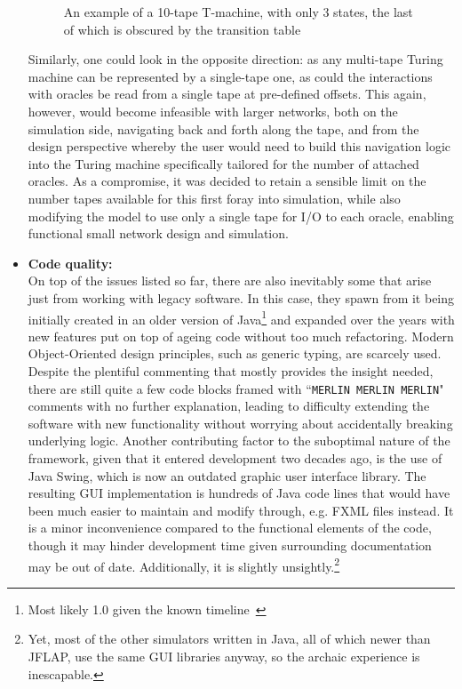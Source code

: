 \documentclass[12pt]{article}
\newcommand{\xmark}{\ding{55}}
\begin{document}
\begin{itemize}
\begin{figure}
					\caption{An example of a 10-tape T-machine, with only 3 states, the last of which is obscured by the transition table}
				\end{figure}
				Similarly, one could look in the opposite direction: as any multi-tape Turing machine can be represented by a single-tape one, as could the interactions with oracles be read from a single tape at pre-defined offsets.
				This again, however, would become infeasible with larger networks, both on the simulation side, navigating back and forth along the tape, and from the design perspective whereby the user would need to build this navigation logic into the Turing machine specifically tailored for the number of attached oracles.
				As a compromise, it was decided to retain a sensible limit on the number tapes available for this first foray into simulation, while also modifying the model to use only a single tape for I/O to each oracle, enabling functional small network design and simulation.\newpage
			\item[\xmark] \textbf{Code quality:\\}
				On top of the issues listed so far, there are also inevitably some that arise just from working with legacy software. In this case, they spawn from it being initially created in an older version of Java\footnote{Most likely 1.0 given the known timeline~\cite{procopiuc1996visualization}} and expanded over the years with new features put on top of ageing code without too much refactoring. Modern Object-Oriented design principles, such as generic typing, are scarcely used. Despite the plentiful commenting that mostly provides the insight needed, there are still quite a few code blocks framed with ``\texttt{MERLIN MERLIN MERLIN}" comments with no further explanation, leading to difficulty extending the software with new functionality without worrying about accidentally breaking underlying logic.
				Another contributing factor to the suboptimal nature of the framework, given that it entered development two decades ago, is the use of Java Swing, which is now an outdated graphic user interface library. The resulting GUI implementation is hundreds of Java code lines that would have been much easier to maintain and modify through, e.g. FXML files instead. It is a minor inconvenience compared to the functional elements of the code, though it may hinder development time given surrounding documentation may be out of date. Additionally, it is slightly unsightly.\footnote{Yet, most of the other simulators written in Java, all of which newer than JFLAP, use the same GUI libraries anyway, so the archaic experience is inescapable.} 

\end{itemize}
\end{document}
